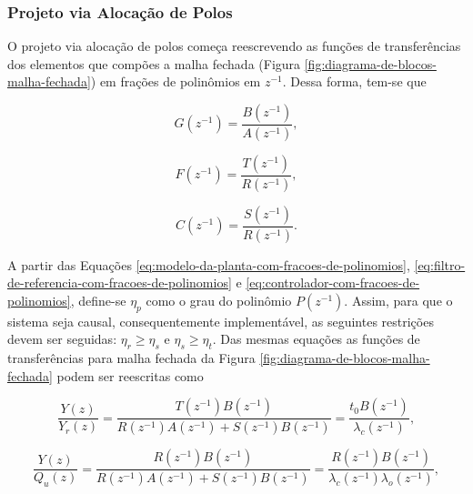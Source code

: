 \subsubsection{Projeto via Alocação de Polos}
\label{subsub:projeto-via-alocacao-de-polos}
O projeto via alocação de polos começa reescrevendo as funções de transferências
dos elementos que compões a malha fechada (Figura
\ref{fig:diagrama-de-blocos-malha-fechada}) em frações de polinômios em
$z^{-1}$. Dessa forma, tem-se que

\begin{equation}
    \label{eq:modelo-da-planta-com-fracoes-de-polinomios}
    G(z^{-1}) = \frac{B(z^{-1})}{A(z^{-1})},
\end{equation}

\begin{equation}
    \label{eq:filtro-de-referencia-com-fracoes-de-polinomios}
    F(z^{-1}) = \frac{T(z^{-1})}{R(z^{-1})},
\end{equation}

\begin{equation}
    \label{eq:controlador-com-fracoes-de-polinomios}
    C(z^{-1}) = \frac{S(z^{-1})}{R(z^{-1})}.
\end{equation}

A partir das Equações \ref{eq:modelo-da-planta-com-fracoes-de-polinomios},
\ref{eq:filtro-de-referencia-com-fracoes-de-polinomios} e
\ref{eq:controlador-com-fracoes-de-polinomios}, define-se $\eta_{p}$ como o grau
do polinômio $P(z^{-1})$. Assim, para que o sistema seja causal,
consequentemente implementável, as seguintes restrições devem ser seguidas:
$\eta_{r} \geq \eta_{s}$ e $\eta_{s} \geq \eta_{t}$. Das mesmas equações
as funções de transferências para malha fechada da Figura
\ref{fig:diagrama-de-blocos-malha-fechada} podem ser reescritas como

\begin{equation}
    \label{eq:ft-da-saida-para-referencia}
    \frac{Y(z)}{Y_{r}(z)} = \frac{T(z^{-1})B(z^{-1})}
                                 {R(z^{-1})A(z^{-1})+S(z^{-1})B(z^{-1})}
                          = \frac{t_{0}B(z^{-1})}{\lambda_{c}(z^{-1})},
\end{equation}

\begin{equation}
    \label{eq:ft-da-saida-para-perturbacao-na-entrada}
    \frac{Y(z)}{Q_{u}(z)} = \frac{R(z^{-1})B(z^{-1})}
                                 {R(z^{-1})A(z^{-1})+S(z^{-1})B(z^{-1})}
                          = \frac{R(z^{-1})B(z^{-1})}
                                 {\lambda_{c}(z^{-1})\lambda_{o}(z^{-1})},
\end{equation}

